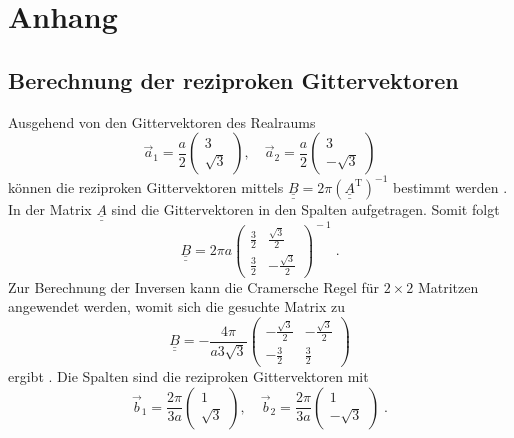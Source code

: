 \chapter{Anhang}
\section{Berechnung der reziproken Gittervektoren}
\label{sec:rez_lattivectors_calc}
Ausgehend von den Gittervektoren des Realraums 
\begin{equation*}
    \vec{a}_1 = \frac{a}{2}\begin{pmatrix} 3 \\[4pt] \sqrt{3}  \end{pmatrix}, \quad
    \vec{a}_2 = \frac{a}{2}\begin{pmatrix} 3 \\[4pt] -\sqrt{3} \end{pmatrix}       
\end{equation*}   
können die reziproken Gittervektoren mittels $\underline{\underline{B}} = 2\pi \left ( \underline{\underline{A}}^\text{T} \right )^{-1} $ bestimmt werden \cite{suter}.
In der Matrix $\underline{\underline{A}}$ sind die Gittervektoren in den Spalten aufgetragen.
Somit folgt 
\begin{equation*}
    \underline{\underline{B}} = 2 \pi a
    \begin{pmatrix}
        \frac{3}{2} & \frac{\sqrt{3}}{2}  \\[0.35em]
        \frac{3}{2} & -\frac{\sqrt{3}}{2}
    \end{pmatrix}^{\! -1} \; .
\end{equation*}
Zur Berechnung der Inversen kann die Cramersche Regel für $2\times 2$ Matritzen angewendet werden, womit sich die gesuchte Matrix zu
\begin{equation*}
    \underline{\underline{B}} = - \frac{4\pi}{a3\sqrt{3}}
    \begin{pmatrix}
        -\frac{\sqrt{3}}{2} & -\frac{\sqrt{3}}{2}  \\[0.35em]
        -\frac{3}{2} & \frac{3}{2}
    \end{pmatrix}
\end{equation*}
ergibt \cite{Cramer}.
Die Spalten sind die reziproken Gittervektoren mit 
\begin{equation*}
    \vec{b}_1 = \frac{2\pi}{3a}\begin{pmatrix} 1        \\[4pt]     \sqrt{3}  \end{pmatrix}, \quad
    \vec{b}_2 = \frac{2\pi}{3a}\begin{pmatrix} 1        \\[4pt] -   \sqrt{3} \end{pmatrix}   \; .  
\end{equation*}
